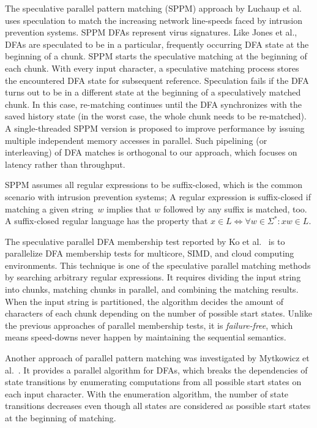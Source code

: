 \documentclass[10pt, conference, compsocconf]{IEEEtran}
\begin{document}
The speculative parallel pattern matching (SPPM) approach by
Luchaup et al.~\cite{Luchaup2011,Luchaup2009} uses speculation to match
the increasing network line-speeds
faced by intrusion prevention systems. SPPM DFAs represent virus
signatures. Like Jones et al.,
DFAs are speculated to be in a particular, frequently occurring DFA state
at the beginning of a chunk. SPPM starts the speculative matching
at the beginning of each chunk. With every input character, a
speculative matching process stores the encountered DFA
state for subsequent reference. Speculation fails if the DFA turns out
to be in a different state at the beginning of a speculatively matched
chunk. In this case, re-matching continues until the DFA
synchronizes with the saved history state (in the worst case, the
whole chunk needs to be re-matched). A single-threaded SPPM
version is proposed to improve performance by issuing multiple
independent memory accesses in parallel.
Such pipelining (or interleaving) of DFA matches is orthogonal to
our approach, which
focuses on latency rather than throughput.

SPPM assumes all regular expressions to be suffix-closed, which is the
common scenario with intrusion prevention systems;
A regular expression is suffix-closed if matching a given string~$w$
implies that $w$ followed by any suffix is matched, too. A suffix-closed
regular language has the property that
$x\in L \Leftrightarrow\forall w \in\Sigma^*: xw\in L$.

The speculative parallel DFA membership test reported by
Ko et al.~\cite{Ko2014} is to parallelize DFA membership tests
for multicore, SIMD, and cloud computing environments.
This technique is one of the speculative parallel matching methods
by searching arbitrary regular expressions. It requires dividing
the input string into chunks, matching chunks in parallel, and combining
the matching results. When the input string is partitioned, the
algorithm decides the amount of characters of each chunk depending on
the number of possible start states.
Unlike the previous approaches of parallel
membership tests, it is {\em failure-free\/}, which means speed-downs
never happen by maintaining the sequential semantics.

Another approach of parallel pattern matching was investigated by
Mytkowicz et al.~\cite{Mytkowicz2014}. It provides a parallel
algorithm for DFAs, which breaks the dependencies of state transitions
by enumerating computations from all possible start states on each
input character. With the enumeration algorithm, the number of
state transitions decreases even though all states are considered as
possible start states at the beginning of matching.
\end{document}
